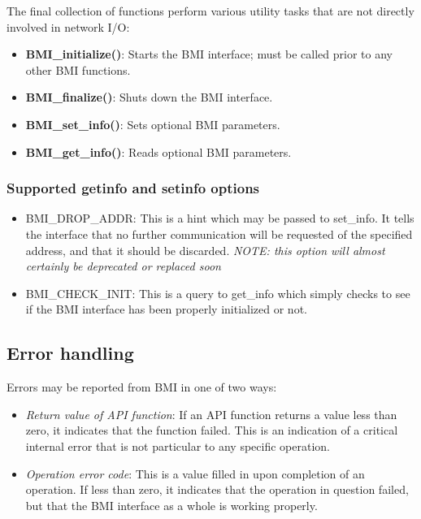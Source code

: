 \documentclass[11pt]{article}
\begin{document}
The final collection of functions perform various utility tasks that are
not directly involved in network I/O:

\begin{itemize}

\item \textbf{BMI\_initialize()}:  Starts the BMI interface; must
be called prior to any other BMI functions.
\item \textbf{BMI\_finalize()}:  Shuts down the BMI interface.
\item \textbf{BMI\_set\_info()}:  Sets optional BMI parameters.
\item \textbf{BMI\_get\_info()}:  Reads optional BMI parameters.

\end{itemize}

\subsubsection{Supported getinfo and setinfo options}

\begin{itemize}
\item BMI\_DROP\_ADDR: This is a hint which may be passed to
set\_info.  It tells the interface that no further communication
will be requested of the specified address, and that it should be
discarded.  \emph{NOTE: this option will almost certainly be
deprecated or replaced soon}
\item BMI\_CHECK\_INIT: This is a query to get\_info which simply
checks to see if the BMI interface has been properly initialized
or not.
\end{itemize}

\subsection{Error handling}

Errors may be reported from BMI in one of two ways:

\begin{itemize}
\item \emph{Return value of API function}:  If an API function
returns a value less than zero, it indicates that the function
failed.  This is an indication of a critical internal error that
is not particular to any specific operation.
\item \emph{Operation error code}:  This is a value filled in upon
completion of an operation.  If less than zero, it indicates that
the operation in question failed, but that the BMI interface as a
whole is working properly.
\end{itemize}
\end{document}
